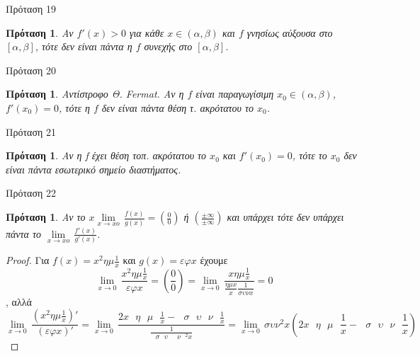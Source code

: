 \documentclass[greek]{beamer}
\newtheorem{proposition}[theorem]{Πρόταση}
\begin{document}
\begin{frame}{Πρόταση 19}
 \begin{proposition}
  \normalfont Αν $f'\left( x  \right)>0$ για κάθε $x\in \left( \alpha ,\beta  \right)$ και $f$ γνησίως αύξουσα στο $\left[ \alpha ,\beta  \right]$, τότε δεν είναι πάντα η $f$ συνεχής στο $\left[ \alpha ,\beta  \right]$.
 \end{proposition}
\end{frame}

\begin{frame}{Πρόταση 20}
 \begin{proposition}
  \normalfont Αντίστροφο Θ. Fermat. Αν η $f$ είναι παραγωγίσιμη ${{x}_{0}}\in \left( \alpha ,\beta  \right)$, $f'\left( {{x}_{0}} \right)=0$, τότε η $f$ δεν είναι πάντα θέση τ. ακρότατου το ${{x}_{0}}$.
 \end{proposition}
\end{frame}

\begin{frame}{Πρόταση 21}
 \begin{proposition}
  \normalfont Αν η f έχει θέση τοπ. ακρότατου το ${{x}_{0}}$ και $f'\left( {{x}_{0}} \right)=0$, τότε το ${{x}_{0}}$ δεν είναι πάντα εσωτερικό σημείο διαστήματος.
 \end{proposition}
\end{frame}

\begin{frame}{Πρόταση 22}
 \begin{proposition}
  \normalfont Αν το $x\underset{x\to xo}{\mathop{\lim }}\,\frac{f\left( x \right)}{g\left( x \right)}=\left( \frac{0}{0} \right)$ ή $\left( \frac{\pm \infty }{\pm \infty } \right)$ και υπάρχει τότε δεν υπάρχει πάντα το $\underset{x\to xo}{\mathop{\lim }}\,\frac{f'\left( x \right)}{g'\left( x \right)}$.
 \end{proposition}
 \begin{proof}
  Για $f\left( x \right)={{x}^{2}}\eta \mu \frac{1}{x}$ και $g\left( x \right)=\varepsilon \varphi x$ έχουμε \[\underset{x\to 0}{\mathop{\lim }}\,\frac{{{x}^{2}}\eta \mu \frac{1}{x}}{\varepsilon \varphi x}=\left( \frac{0}{0} \right)=\underset{x\to 0}{\mathop{\lim }}\,\frac{x\eta \mu \frac{1}{x}}{\frac{\eta \mu x}{x}\frac{1}{\sigma \upsilon \nu x}}=0\], αλλά
  \[\underset{x\to 0}{\mathop{\lim }}\,\frac{\left( {{x}^{2}}\eta \mu \frac{1}{x} \right)'}{\left( \varepsilon \varphi x \right)'}=\underset{x\to 0}{\mathop{\lim }}\,\frac{2x\text{ }\!\!\eta\!\!\text{  }\!\!\mu\!\!\text{ }\frac{1}{x}-\text{ }\!\!\sigma\!\!\text{  }\!\!\upsilon\!\!\text{  }\!\!\nu\!\!\text{ }\frac{1}{x}}{\frac{1}{\text{ }\!\!\sigma\!\!\text{  }\!\!\upsilon\!\!\text{ }{{\text{ }\!\!\nu\!\!\text{ }}^{2}}x}}=\underset{x\to 0}{\mathop{\lim }}\,\sigma \upsilon {{\nu }^{2}}x\left( 2x\text{ }\!\!\eta\!\!\text{  }\!\!\mu\!\!\text{ }\frac{1}{x}-\text{ }\!\!\sigma\!\!\text{  }\!\!\upsilon\!\!\text{  }\!\!\nu\!\!\text{ }\frac{1}{x} \right)\]
 \end{proof}
\end{frame}
\end{document}
